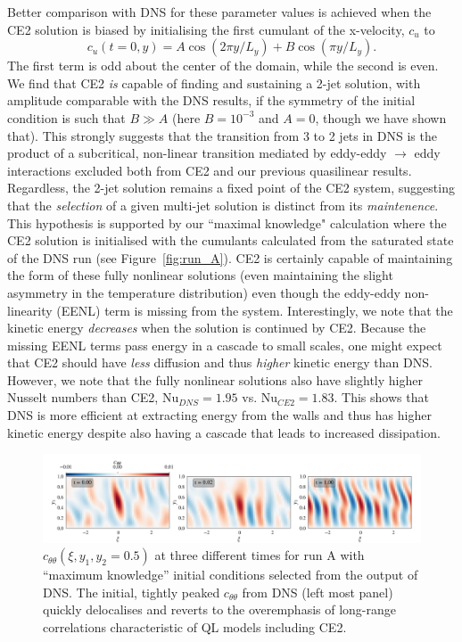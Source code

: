 \documentclass{jfm}
\newcommand{\cu}{c_u}
\newcommand{\ctt}{c_{\theta \theta}}
\begin{document}
Better comparison with DNS for these parameter values is achieved when the CE2 solution is biased 
 by initialising the first cumulant of the x-velocity, $\cu$ to
\begin{equation}
  \label{eq:bias}
  \cu(t=0, y) = A \cos(2\pi y/L_y) + B \cos (\pi y/L_y).
\end{equation}
The first term is odd about the center of the domain, while the second is even.
We find that CE2 \emph{is} capable of finding and sustaining a 2-jet solution, with amplitude comparable with the DNS results, if the symmetry of the initial condition is such that $B \gg A$ (here $B = 10^{-3}$ and $A = 0$, though we have shown that).
This strongly suggests that the transition from 3 to 2 jets in DNS is the product of a subcritical, non-linear transition mediated by eddy-eddy $\to$ eddy interactions excluded both from CE2 and our previous quasilinear results.
Regardless, the 2-jet solution remains a fixed point of the CE2 system, suggesting that the \emph{selection} of a given multi-jet solution is distinct from its \emph{maintenence}.
This hypothesis is supported by our ``maximal knowledge" calculation where the CE2 solution is initialised with the cumulants calculated from the saturated state of the DNS run (see Figure~\ref{fig:run_A}). CE2 is certainly capable of maintaining the form of these fully nonlinear solutions (even maintaining the slight asymmetry in the temperature distribution) even though the eddy-eddy non-linearity (EENL) term is missing from the system.
Interestingly, we note that the kinetic energy \emph{decreases} when the solution is continued by CE2. Because the missing EENL terms pass energy in a cascade to small scales, one might expect that CE2 should have \emph{less} diffusion and thus \emph{higher} kinetic energy than DNS.
However, we note that the fully nonlinear solutions also have slightly higher Nusselt numbers than CE2, $\mathrm{Nu}_{DNS} = 1.95$ vs. $\mathrm{Nu}_{CE2} = 1.83$. This shows that DNS is more efficient at extracting energy from the walls and thus has higher kinetic energy despite also having a cascade that leads to increased dissipation.
\begin{figure}
    \centering
    \includegraphics[width=\textwidth]{run_A_decoherence.pdf}
    \caption{$\ctt(\xi, y_1, y_2 = 0.5)$ at three different times for run A with ``maximum knowledge'' initial conditions selected from the output of DNS. The initial, tightly peaked $\ctt$ from DNS (left most panel) quickly delocalises and reverts to the overemphasis of long-range correlations characteristic of QL models including CE2.}
    \label{fig:run_A_decoherence}
\end{figure}
\end{document}
